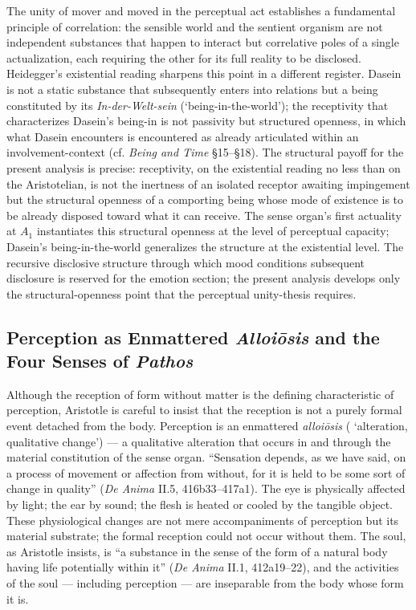The unity of mover and moved in the perceptual act establishes a fundamental principle of correlation: the sensible world and the sentient organism are not independent substances that happen to interact but correlative poles of a single actualization, each requiring the other for its full reality to be disclosed. Heidegger's existential reading sharpens this point in a different register. Dasein is not a static substance that subsequently enters into relations but a being constituted by its \textit{In-der-Welt-sein} (`being-in-the-world'); the receptivity that characterizes Dasein's being-in is not passivity but structured openness, in which what Dasein encounters is encountered as already articulated within an involvement-context (cf. \textit{Being and Time} \S 15--\S 18). The structural payoff for the present analysis is precise: receptivity, on the existential reading no less than on the Aristotelian, is not the inertness of an isolated receptor awaiting impingement but the structural openness of a comporting being whose mode of existence is to be already disposed toward what it can receive. The sense organ's first actuality at $A_1$ instantiates this structural openness at the level of perceptual capacity; Dasein's being-in-the-world generalizes the structure at the existential level. The recursive disclosive structure through which mood conditions subsequent disclosure is reserved for the emotion section; the present analysis develops only the structural-openness point that the perceptual unity-thesis requires.

\subsection{Perception as Enmattered \textit{Alloiōsis} and the Four Senses of \textit{Pathos}}

Although the reception of form without matter is the defining characteristic of perception, Aristotle is careful to insist that the reception is not a purely formal event detached from the body. Perception is an enmattered \textit{alloiōsis} ( `alteration, qualitative change') --- a qualitative alteration that occurs in and through the material constitution of the sense organ. ``Sensation depends, as we have said, on a process of movement or affection from without, for it is held to be some sort of change in quality'' (\textit{De Anima} II.5, 416b33--417a1). The eye is physically affected by light; the ear by sound; the flesh is heated or cooled by the tangible object. These physiological changes are not mere accompaniments of perception but its material substrate; the formal reception could not occur without them. The soul, as Aristotle insists, is ``a substance in the sense of the form of a natural body having life potentially within it'' (\textit{De Anima} II.1, 412a19--22), and the activities of the soul --- including perception --- are inseparable from the body whose form it is.

